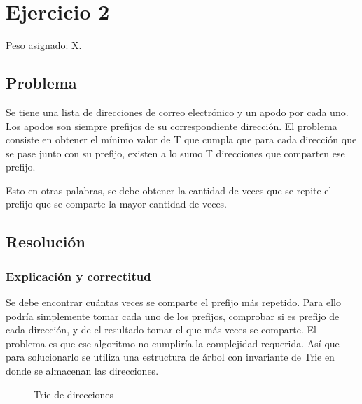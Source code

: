 \section{Ejercicio 2}

Peso asignado: X.

\subsection{Problema}

Se tiene una lista de direcciones de correo electrónico y un apodo por cada
uno. Los apodos son siempre prefijos de su correspondiente dirección. El
problema consiste en obtener el mínimo valor de T que cumpla que para cada
dirección que se pase junto con su prefijo, existen a lo sumo T direcciones
que comparten ese prefijo.

Esto en otras palabras, se debe obtener la cantidad de veces que se repite el
prefijo que se comparte la mayor cantidad de veces.

\subsection{Resolución}

\subsubsection{Explicación y correctitud}

Se debe encontrar cuántas veces se comparte el prefijo más repetido. Para ello
podría simplemente tomar cada uno de los prefijos, comprobar si es prefijo de
cada dirección, y de el resultado tomar el que más veces se comparte. El
problema es que ese algoritmo no cumpliría la complejidad requerida. Así que
para solucionarlo se utiliza una estructura de árbol con invariante de Trie
en donde se almacenan las direcciones.

\begin{figure}[ht]
	\caption{Trie de direcciones}
	\label{ej2:trie}
	\centering
\end{figure}

